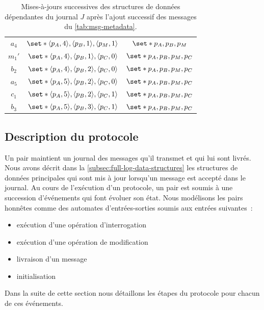\begin{table}[ht]
\begin{subtable}{\linewidth}
\begin{tabular}{ccc}
        $a_4$ & $\set*{\tuple*{p_A, 4}, \tuple*{p_B, 1}, \tuple*{p_M, 1}}$ & $\set*{p_A,p_B,p_M}$ \\
        $m_1'$ & $\set*{\tuple*{p_A, 4}, \tuple*{p_B, 1}, \tuple*{p_C, 0}}$ & $\set*{p_A,p_B,p_M,p_C}$ \\
        $b_2$ & $\set*{\tuple*{p_A, 4}, \tuple*{p_B, 2}, \tuple*{p_C, 0}}$ & $\set*{p_A,p_B,p_M,p_C}$ \\
        $a_5$ & $\set*{\tuple*{p_A, 5}, \tuple*{p_B, 2}, \tuple*{p_C, 0}}$ & $\set*{p_A,p_B,p_M,p_C}$ \\
        $c_1$ & $\set*{\tuple*{p_A, 5}, \tuple*{p_B, 2},\tuple*{p_C, 1}}$ & $\set*{p_A,p_B,p_M,p_C}$ \\
        $b_3$ & $\set*{\tuple*{p_A, 5}, \tuple*{p_B, 3}, \tuple*{p_C, 1}}$ & $\set*{p_A,p_B,p_M,p_C}$ \\
    \end{tabular}
    \end{subtable}
    \caption[Exemple de mises-à-jours de structures de données dépendantes d'un' journal]{Mises-à-jours successives des structures de données dépendantes du journal $J$ après l'ajout successif des messages du \autoref{tab:msg-metadata}.}\label{tab:data-structure-update}
\end{table}
 

\subsection{Description du protocole}

Un pair maintient un journal des messages qu'il transmet et qui lui sont livrés.
Nous avons décrit dans la \autoref{subsec:full-log-data-structures} les structures de données principales qui sont mis à jour lorsqu'un message est accepté dans le journal.
Au cours de l'exécution d'un protocole, un pair est soumis à une succession d'événements qui font évoluer son état.
Nous modélisons les pairs honnêtes comme des automates d'entrées-sorties soumis aux entrées suivantes~:
\begin{itemize}
    \item exécution d'une opération d'interrogation
    \item exécution d'une opération de modification
    \item livraison d'un message
    \item initialisation
\end{itemize}

Dans la suite de cette section nous détaillons les étapes du protocole pour chacun de ces événements.

